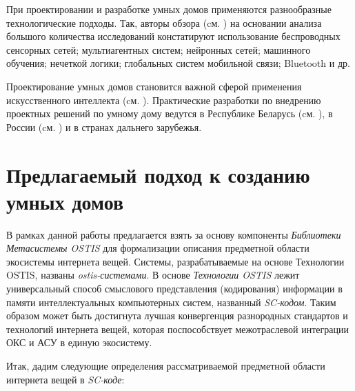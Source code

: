 При проектировании и разработке умных домов применяются разнообразные технологические подходы. Так, авторы обзора (cм. ) на основании анализа большого количества исследований констатируют использование  беспроводных сенсорных сетей; мультиагентных систем; нейронных сетей; машинного обучения; нечеткой логики; глобальных систем мобильной связи; Bluetooth и др.

Проектирование умных домов становится важной сферой применения искусственного интеллекта (cм. ). Практические разработки по внедрению проектных решений по умному дому ведутся в Республике Беларусь (cм. ), в России (cм. ) и в странах дальнего зарубежья.

\section{Предлагаемый подход к созданию умных домов}
\label{sec_proposed_approach_SH}


В рамках данной работы предлагается взять за основу компоненты \textit{Библиотеки Метасистемы OSTIS} \cite{Standart2021} для формализации описания предметной области экосистемы интернета вещей. Системы, разрабатываемые на основе Технологии OSTIS, названы \textit{ostis-системами}. В основе \textit{Технологии OSTIS} лежит универсальный способ смыслового представления (кодирования) информации в памяти интеллектуальных компьютерных систем, названный \textit{SC-кодом}. Таким образом может быть достигнута лучшая конвергенция разнородных стандартов и технологий интернета вещей, которая поспособствует межотраслевой интеграции ОКС и АСУ в единую экосистему.

Итак, дадим следующие определения рассматриваемой предметной области интернета вещей в \textit{SC-коде}:
\begin{SCn}
\end{SCn}

